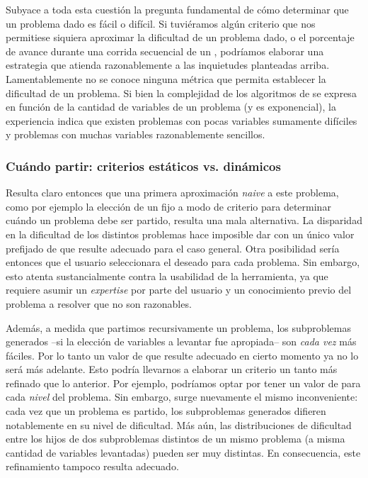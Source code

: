 Subyace a toda esta cuestión la pregunta fundamental de cómo determinar que un
problema dado es fácil o difícil. Si tuviéramos algún criterio que nos
permitiese siquiera aproximar la dificultad de un problema dado, o el
porcentaje de avance durante una corrida secuencial de un \ssolver, podríamos
elaborar una estrategia que atienda razonablemente a las inquietudes
planteadas arriba. Lamentablemente no se conoce ninguna métrica que permita
establecer \apriori la dificultad de un problema. Si bien la complejidad de
los algoritmos de \ssolving se expresa en función de la cantidad de variables
de un problema (y es exponencial), la experiencia indica que existen problemas
con pocas variables sumamente difíciles y problemas con muchas variables
razonablemente sencillos.

\subsubsection{Cuándo partir: criterios estáticos vs. dinámicos}

Resulta claro entonces que una primera aproximación \emph{naive} a este
problema, como por ejemplo la elección de un \tout fijo a modo de criterio para
determinar cuándo un problema debe ser partido, resulta una mala alternativa.
La disparidad en la dificultad de los distintos problemas hace imposible
dar con un único valor prefijado de \tout que resulte adecuado para el
caso general. Otra posibilidad sería entonces que el usuario seleccionara
el \tout deseado para cada problema. Sin embargo, esto atenta sustancialmente
contra la usabilidad de la herramienta, ya que requiere asumir un \emph{expertise} por
parte del usuario y un conocimiento previo del problema a resolver que no son
razonables.

Además, a medida que partimos recursivamente un problema, los subproblemas
generados --si la elección de variables a levantar fue apropiada-- son
\emph{cada vez} más fáciles. Por lo tanto un valor de \tout que resulte
adecuado en cierto momento ya no lo será más adelante. Esto podría llevarnos a
elaborar un criterio un tanto más refinado que lo anterior. Por ejemplo,
podríamos optar por tener un valor de \tout para cada \emph{nivel} del
problema. Sin embargo, surge nuevamente el mismo inconveniente: cada vez
que un problema es partido, los subproblemas generados difieren notablemente
en su nivel de dificultad. Más aún, las distribuciones de dificultad entre
los hijos de dos subproblemas distintos de un mismo problema (a misma cantidad
de variables levantadas) pueden ser muy distintas. En consecuencia, este
refinamiento tampoco resulta adecuado.

